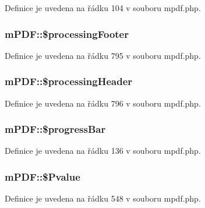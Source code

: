 Definice je uvedena na řádku 104 v souboru mpdf.\-php.

\hypertarget{classm_p_d_f_afa84c52e5a6371f847d0c3c9cc049453}{
\subsubsection[{\$processing\-Footer}]{\setlength{\rightskip}{0pt plus 5cm}m\-P\-D\-F\-::\$processing\-Footer}}\label{classm_p_d_f_afa84c52e5a6371f847d0c3c9cc049453}


Definice je uvedena na řádku 795 v souboru mpdf.\-php.

\hypertarget{classm_p_d_f_ac5e4e20dfc535dc8a2fc31e8ebc0a5cc}{
\subsubsection[{\$processing\-Header}]{\setlength{\rightskip}{0pt plus 5cm}m\-P\-D\-F\-::\$processing\-Header}}\label{classm_p_d_f_ac5e4e20dfc535dc8a2fc31e8ebc0a5cc}


Definice je uvedena na řádku 796 v souboru mpdf.\-php.

\hypertarget{classm_p_d_f_ac570654011644c05fb5babb85c96b35a}{
\subsubsection[{\$progress\-Bar}]{\setlength{\rightskip}{0pt plus 5cm}m\-P\-D\-F\-::\$progress\-Bar}}\label{classm_p_d_f_ac570654011644c05fb5babb85c96b35a}


Definice je uvedena na řádku 136 v souboru mpdf.\-php.

\hypertarget{classm_p_d_f_a730754a3371fcff860fb1e0af88e4a71}{
\subsubsection[{\$\-Pvalue}]{\setlength{\rightskip}{0pt plus 5cm}m\-P\-D\-F\-::\$\-Pvalue}}\label{classm_p_d_f_a730754a3371fcff860fb1e0af88e4a71}


Definice je uvedena na řádku 548 v souboru mpdf.\-php.

